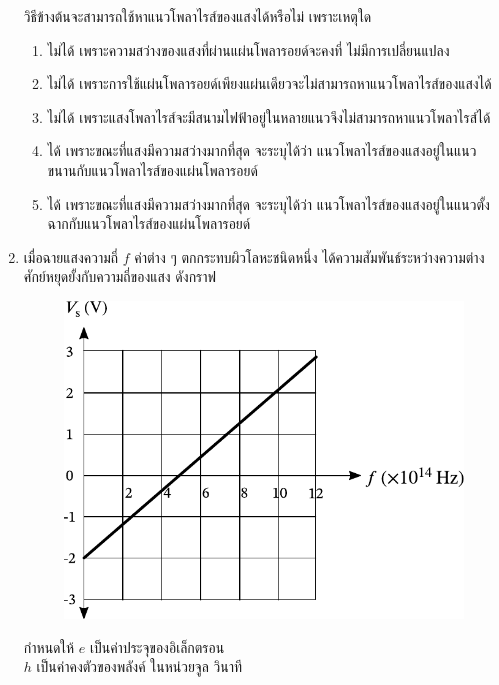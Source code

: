 \documentclass[a4paper, 12pt]{article}
\begin{document}
\begin{enumerate}
\begin{figure}[H]
          \end{figure}
          วิธีข้างต้นจะสามารถใช้หาแนวโพลาไรส์ของแสงได้หรือไม่ เพราะเหตุใด
          \begin{enumerate}
              \item ไม่ได้ เพราะความสว่างของแสงที่ผ่านแผ่นโพลารอยด์จะคงที่ ไม่มีการเปลี่ยนแปลง
              \item ไม่ได้ เพราะการใช้แผ่นโพลารอยด์เพียงแผ่นเดียวจะไม่สามารถหาแนวโพลาไรส์ของแสงได้
              \item ไม่ได้ เพราะแสงโพลาไรส์จะมีสนามไฟฟ้าอยู่ในหลายแนวจึงไม่สามารถหาแนวโพลาไรส์ได้
              \item ได้ เพราะขณะที่แสงมีความสว่างมากที่สุด จะระบุได้ว่า แนวโพลาไรส์ของแสงอยู่ในแนวขนานกับแนวโพลาไรส์ของแผ่นโพลารอยด์
              \item ได้ เพราะขณะที่แสงมีความสว่างมากที่สุด จะระบุได้ว่า แนวโพลาไรส์ของแสงอยู่ในแนวตั้งฉากกับแนวโพลาไรส์ของแผ่นโพลารอยด์
          \end{enumerate}
          \newpage
    \item เมื่อฉายแสงความถี่ \(f\) ค่าต่าง ๆ ตกกระทบผิวโลหะชนิดหนึ่ง ได้ความสัมพันธ์ระหว่างความต่างศักย์หยุดยั้งกับความถี่ของแสง ดังกราฟ \\
          \begin{figure}[H]
              \centering
              \includegraphics{images/17_23.pdf}
          \end{figure}
          กำหนดให้ \(e\) เป็นค่าประจุของอิเล็กตรอน \\
          \(h\) เป็นค่าคงตัวของพลังค์ ในหน่วยจูล วินาที \\

\end{enumerate}
\end{document}
